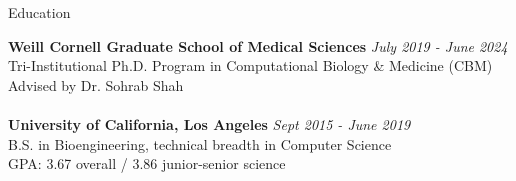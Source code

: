 \documentclass{resume} %
\begin{document}

\begin{rSection}{Education}

{\bf Weill Cornell Graduate School of Medical Sciences} \hfill {\em July 2019 - June 2024} 
\\ Tri-Institutional Ph.D. Program in Computational Biology \& Medicine (CBM)
\\ Advised by Dr. Sohrab Shah
\\
\\{\bf University of California, Los Angeles} \hfill {\em Sept 2015 - June 2019} 
\\ B.S. in Bioengineering, technical breadth in Computer Science
\\ GPA: 3.67 overall / 3.86 junior-senior science

\end{rSection}

\end{document}
